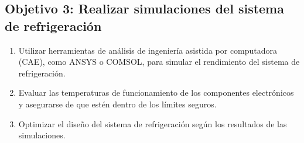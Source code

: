 \begin{minipage}{\linewidth}
\subsection*{Objetivo 3: Realizar simulaciones del sistema de refrigeración}
\begin{enumerate}[label=3.\arabic*]
    \item Utilizar herramientas de análisis de ingeniería asistida por computadora (CAE), como ANSYS o COMSOL, para simular el rendimiento del sistema de refrigeración.
    \item Evaluar las temperaturas de funcionamiento de los componentes electrónicos y asegurarse de que estén dentro de los límites seguros.
    \item Optimizar el diseño del sistema de refrigeración según los resultados de las simulaciones.
\end{enumerate}
\end{minipage}